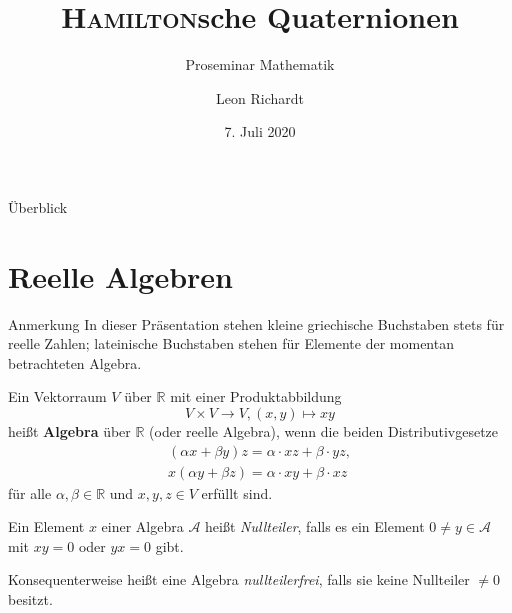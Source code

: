 \documentclass[aspectratio=169]{beamer}
\title{\textsc{Hamilton}sche Quaternionen}
\subtitle{Proseminar Mathematik}
\author[L.~Richardt]{Leon Richardt}
\date[2020-07-07]{7. Juli 2020}
\institute{Universität Osnabrück}
\newcommand{\R}{\ensuremath{\mathbb{R}}{ }}
\begin{document}
    \begin{frame}
        \titlepage
    \end{frame}

    \begin{frame}{Überblick}
        \tableofcontents
    \end{frame}

    \section{Reelle Algebren}
    \begin{frame}
        \begin{block}{Anmerkung}
            In dieser Präsentation stehen kleine griechische Buchstaben stets für reelle Zahlen; lateinische Buchstaben stehen für Elemente der momentan betrachteten Algebra.
        \end{block}
    \end{frame}

    \begin{frame}
        \begin{definition}
            Ein Vektorraum \(V\) über \R mit einer Produktabbildung
            \[
                V \times V \to V, (x, y) \mapsto xy
            \]
            heißt \textbf{Algebra} über \R (oder reelle Algebra), wenn die beiden Distributivgesetze
            \begin{gather*}
                (\alpha x + \beta y) z = \alpha \cdot xz + \beta \cdot yz, \\
                x (\alpha y + \beta z) = \alpha \cdot xy + \beta \cdot xz
            \end{gather*}
            für alle \(\alpha, \beta \in \R\) und \(x, y, z \in V\) erfüllt sind.
        \end{definition}
    \end{frame}

    \begin{frame}
        \begin{definition}
            Ein Element \(x\) einer Algebra \(\mathcal{A}\) heißt \textit{Nullteiler}, falls es ein Element \(0 \neq y \in \mathcal{A}\) mit \(xy = 0\) oder \(yx = 0\) gibt.

            Konsequenterweise heißt eine Algebra \textit{nullteilerfrei}, falls sie keine Nullteiler \(\neq 0\) besitzt.
        \end{definition}
    \end{frame}
\end{document}
